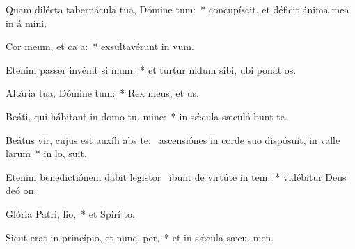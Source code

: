 \item Quam dilécta tabernácula tua, Dómine tum:~* concupíscit, et déficit ánima mea in á mini.
\item Cor meum, et ca a:~* exsultavérunt in  vum.
\item Etenim passer invénit si mum:~* et turtur nidum sibi, ubi ponat  os.
\item Altária tua, Dómine tum:~* Rex meus, et  us.
\item Beáti, qui hábitant in domo tu, mine:~* in sǽcula sæculó bunt te.
\item Beátus vir, cujus est auxíli abs te:~\pscross{} ascensiónes in corde suo dispósuit, in valle larum~* in lo,  suit.
\item Etenim benedictiónem dabit legistor~\pscross{} ibunt de virtúte in tem:~* vidébitur Deus deó  on.
\item Glória Patri,  lio,~* et Spirí to.
\item Sicut erat in princípio, et nunc,  per,~* et in sǽcula sæcu. men.
